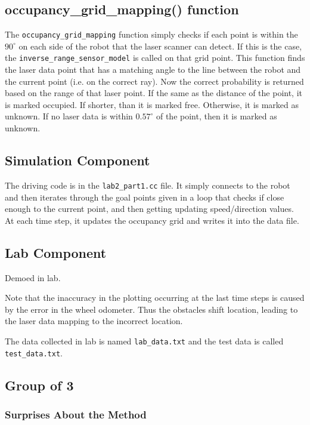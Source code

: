 \documentclass[10pt, titlepage, onecolumn, fleqn]{article}
\begin{document}
\subsection{occupancy\_grid\_mapping() function}

The \verb|occupancy_grid_mapping| function simply checks if each point is within the $90^\circ$ on each side of the robot that the laser scanner can detect. If this is the case, the \verb|inverse_range_sensor_model| is called on that grid point. This function finds the laser data point that has a matching angle to the line between the robot and the current point (i.e. on the correct ray). Now the correct probability is returned based on the range of that laser point. If the same as the distance of the point, it is marked occupied. If shorter, than it is marked free. Otherwise, it is marked as unknown. If no laser data is within $0.57^\circ$ of the point, then it is marked as unknown.

\subsection{Simulation Component}

The driving code is in the \verb|lab2_part1.cc| file. It simply connects to the robot and then iterates through the goal points given in a loop that checks if close enough to the current point, and then getting updating speed/direction values. At each time step, it updates the occupancy grid and writes it into the data file.

\subsection{Lab Component}

Demoed in lab.

Note that the inaccuracy in the plotting occurring at the last time steps is caused by the error in the wheel odometer. Thus the obstacles shift location, leading to the laser data mapping to the incorrect location.

The data collected in lab is named \verb|lab_data.txt| and the test data is called \verb|test_data.txt|.

\subsection{Group of 3}

\subsubsection{Surprises About the Method}
\end{document}
